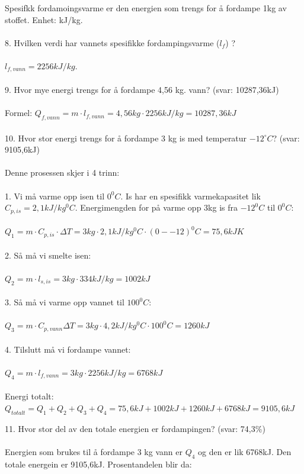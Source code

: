 \documentclass{minmal}
\begin{document}
Spesifkk fordamoingsvarme er den energien som trengs for å fordampe 1kg av stoffet.  Enhet: kJ/kg.\\\\
8. Hvilken verdi har vannets spesifikke fordampingsvarme ($l_f$) ?\\\\  $l_{f,vann}=2256kJ/kg$.\\\\
9. Hvor mye energi trengs for å fordampe 4,56 kg. vann? (svar: 10287,36kJ) \\\\
Formel: $Q_{f,vann}=m\cdot l_{f,vann}=4,56kg\cdot 2256kJ/kg=10287,36kJ$\\\\
10. Hvor stor energi trengs for å fordampe 3 kg is med temperatur $-12^\circ C$? (svar: 9105,6kJ) \\\\
Denne prosessen skjer i 4 trinn:\\\\
1. Vi må varme opp isen til $0^0C$.  Is har en spesifikk varmekapasitet lik $C_{p,is}=2,1kJ/kg^0C$.  Energimengden for på varme opp 3kg is fra $-12^0C$ til $0^0C$:\\\\
$Q_1=m\cdot C_{p,is}\cdot \Delta T=3kg\cdot 2,1kJ/kg^0C\cdot (0--12)^0C=75,6kJK$\\\\
2. Så må vi smelte isen:\\\\
$Q_2=m\cdot l_{s,is}=3kg\cdot 334kJ/kg=1002kJ$\\\\
3. Så må vi varme opp vannet til $100^0C$:\\\\
$Q_3=m\cdot C_{p,vann}\Delta T=3kg\cdot 4,2kJ/kg^0C\cdot 100^0C=1260kJ$\\\\
4. Tilslutt må vi fordampe vannet:\\\\
$Q_4=m\cdot l_{f,vann}=3kg\cdot 2256kJ/kg=6768kJ$\\\\
Energi totalt:
$Q_{totalt}=Q_1+Q_2+Q_3+Q_4=75,6kJ+1002kJ+1260kJ+6768kJ=9105,6kJ$
\newpage

11. Hvor stor del av den totale energien er fordampingen? (svar: 74,3\%)\\\\Energien som brukes til å fordampe 3 kg vann er $Q_4$ og den er lik  6768kJ.   Den totale energein er 9105,6kJ.  Prosentandelen blir da:\\\\
\end{document}
